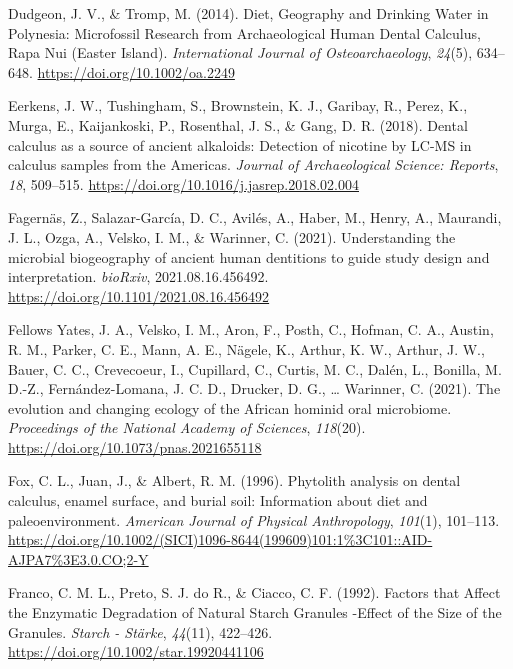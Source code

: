 \documentclass[
  b5paper,
]{book}
\newlength{\cslhangindent}
\newlength{\cslentryspacingunit} %
\newenvironment{CSLReferences}[2] %
 {%
  \setlength{\parindent}{0pt}
  \ifodd #1
  \let\oldpar\par
  \def\par{\hangindent=\cslhangindent\oldpar}
  \fi
  \setlength{\parskip}{#2\cslentryspacingunit}
 }%
 {}
\begin{document}
\begin{CSLReferences}{1}{0}
\leavevmode{}%
Dudgeon, J. V., \& Tromp, M. (2014). Diet, {Geography} and {Drinking
Water} in {Polynesia}: {Microfossil Research} from {Archaeological Human
Dental Calculus}, {Rapa Nui} ({Easter Island}). \emph{International
Journal of Osteoarchaeology}, \emph{24}(5), 634--648.
\url{https://doi.org/10.1002/oa.2249}

\leavevmode{}%
Eerkens, J. W., Tushingham, S., Brownstein, K. J., Garibay, R., Perez,
K., Murga, E., Kaijankoski, P., Rosenthal, J. S., \& Gang, D. R. (2018).
Dental calculus as a source of ancient alkaloids: {Detection} of
nicotine by {LC-MS} in calculus samples from the {Americas}.
\emph{Journal of Archaeological Science: Reports}, \emph{18}, 509--515.
\url{https://doi.org/10.1016/j.jasrep.2018.02.004}

\leavevmode{}%
Fagernäs, Z., Salazar-García, D. C., Avilés, A., Haber, M., Henry, A.,
Maurandi, J. L., Ozga, A., Velsko, I. M., \& Warinner, C. (2021).
Understanding the microbial biogeography of ancient human dentitions to
guide study design and interpretation. \emph{bioRxiv},
2021.08.16.456492. \url{https://doi.org/10.1101/2021.08.16.456492}

\leavevmode{}%
Fellows Yates, J. A., Velsko, I. M., Aron, F., Posth, C., Hofman, C. A.,
Austin, R. M., Parker, C. E., Mann, A. E., Nägele, K., Arthur, K. W.,
Arthur, J. W., Bauer, C. C., Crevecoeur, I., Cupillard, C., Curtis, M.
C., Dalén, L., Bonilla, M. D.-Z., Fernández-Lomana, J. C. D., Drucker,
D. G., \ldots{} Warinner, C. (2021). The evolution and changing ecology
of the {African} hominid oral microbiome. \emph{Proceedings of the
National Academy of Sciences}, \emph{118}(20).
\url{https://doi.org/10.1073/pnas.2021655118}

\leavevmode{}%
Fox, C. L., Juan, J., \& Albert, R. M. (1996). Phytolith analysis on
dental calculus, enamel surface, and burial soil: {Information} about
diet and paleoenvironment. \emph{American Journal of Physical
Anthropology}, \emph{101}(1), 101--113.
\url{https://doi.org/10.1002/(SICI)1096-8644(199609)101:1\%3C101::AID-AJPA7\%3E3.0.CO;2-Y}

\leavevmode{}%
Franco, C. M. L., Preto, S. J. do R., \& Ciacco, C. F. (1992). Factors
that {Affect} the {Enzymatic Degradation} of {Natural Starch Granules}
-{Effect} of the {Size} of the {Granules}. \emph{Starch - St{ä}rke},
\emph{44}(11), 422--426. \url{https://doi.org/10.1002/star.19920441106}


\end{CSLReferences}
\end{document}
